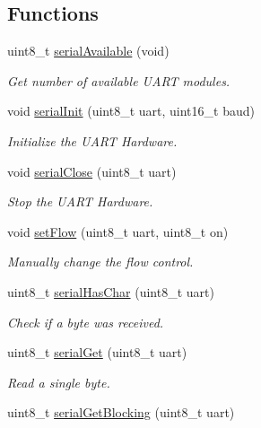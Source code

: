 \subsection*{Functions}
\begin{DoxyCompactItemize}
\item 
uint8\-\_\-t \hyperlink{group__uart_ga1ea963b291215ad9c5e8a0610f116b90}{serial\-Available} (void)
\begin{DoxyCompactList}\small\item\em Get number of available U\-A\-R\-T modules. \end{DoxyCompactList}\item 
void \hyperlink{group__uart_ga73d4335cb201753c580c87954f493886}{serial\-Init} (uint8\-\_\-t uart, uint16\-\_\-t baud)
\begin{DoxyCompactList}\small\item\em Initialize the U\-A\-R\-T Hardware. \end{DoxyCompactList}\item 
void \hyperlink{group__uart_gaa16a5ecaf9e40660ded50737ff1d0a88}{serial\-Close} (uint8\-\_\-t uart)
\begin{DoxyCompactList}\small\item\em Stop the U\-A\-R\-T Hardware. \end{DoxyCompactList}\item 
void \hyperlink{group__uart_ga5d5de9e3ed5a0be11f707113cfff33f5}{set\-Flow} (uint8\-\_\-t uart, uint8\-\_\-t on)
\begin{DoxyCompactList}\small\item\em Manually change the flow control. \end{DoxyCompactList}\item 
uint8\-\_\-t \hyperlink{group__uart_ga266a54dcf3c4b85d92bf6b16bdcb5069}{serial\-Has\-Char} (uint8\-\_\-t uart)
\begin{DoxyCompactList}\small\item\em Check if a byte was received. \end{DoxyCompactList}\item 
uint8\-\_\-t \hyperlink{group__uart_gaa9d6e44600b215154c3f66193df151f6}{serial\-Get} (uint8\-\_\-t uart)
\begin{DoxyCompactList}\small\item\em Read a single byte. \end{DoxyCompactList}\item 
uint8\-\_\-t \hyperlink{group__uart_gaf7c4238a9a5e8fff64af1faf1689a5a4}{serial\-Get\-Blocking} (uint8\-\_\-t uart)

\end{DoxyCompactItemize}
